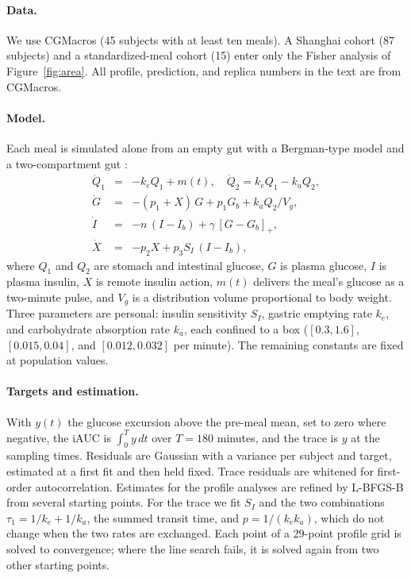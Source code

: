 \documentclass[letterpaper]{article} %
\newcommand{\resCohortCgmSubjects}{45}
\newcommand{\resCohortHallSubjects}{15}
\newcommand{\resCohortShanghaiSubjects}{87}
\begin{document}
\paragraph{Data.} We use CGMacros \citep{das2025cgmacros} (\resCohortCgmSubjects{} subjects with at least ten meals). A Shanghai cohort \citep{zhao2023shanghai} (\resCohortShanghaiSubjects{} subjects) and a standardized-meal cohort \citep{hall2018glucotypes} (\resCohortHallSubjects{}) enter only the Fisher analysis of Figure~\ref{fig:area}. All profile, prediction, and replica numbers in the text are from CGMacros.

\paragraph{Model.} Each meal is simulated alone from an empty gut with a Bergman-type model \citep{bergman1979} and a two-compartment gut \citep[for a fuller meal model, see][]{dallaman2007}:
\begin{eqnarray}
\dot Q_1 &=& -k_e Q_1 + m(t),\quad \dot Q_2 = k_e Q_1 - k_a Q_2,\nonumber\\
\dot G &=& -(p_1 + X)\,G + p_1 G_b + k_a Q_2 / V_g,\nonumber\\
\dot I &=& -n\,(I - I_b) + \gamma\,[G - G_b]_+,\nonumber\\
\dot X &=& -p_2 X + p_3 S_I\,(I - I_b),\nonumber
\end{eqnarray}
where $Q_1$ and $Q_2$ are stomach and intestinal glucose, $G$ is plasma glucose, $I$ is plasma insulin, $X$ is remote insulin action, $m(t)$ delivers the meal's glucose as a two-minute pulse, and $V_g$ is a distribution volume proportional to body weight. Three parameters are personal: insulin sensitivity $S_I$, gastric emptying rate $k_e$, and carbohydrate absorption rate $k_a$, each confined to a box ($[0.3,1.6]$, $[0.015,0.04]$, and $[0.012,0.032]$ per minute). The remaining constants are fixed at population values.

\paragraph{Targets and estimation.} With $y(t)$ the glucose excursion above the pre-meal mean, set to zero where negative, the iAUC is $\int_0^T y\,dt$ over $T=180$ minutes, and the trace is $y$ at the sampling times. Residuals are Gaussian with a variance per subject and target, estimated at a first fit and then held fixed. Trace residuals are whitened for first-order autocorrelation. Estimates for the profile analyses are refined by L-BFGS-B from several starting points. For the trace we fit $S_I$ and the two combinations $\tau_1=1/k_e+1/k_a$, the summed transit time, and $p=1/(k_e k_a)$, which do not change when the two rates are exchanged. Each point of a $29$-point profile grid is solved to convergence; where the line search fails, it is solved again from two other starting points.
\end{document}
